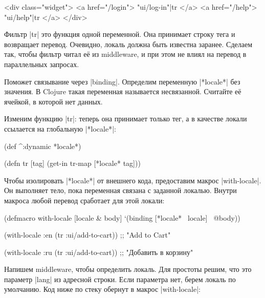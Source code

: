 \begin{english}
  \begin{htmldjango}
<div class="widget">
  <a href="/login">{{ "ui/log-in"|tr }}</a>
  <a href="/help">{{ "ui/help"|tr }}</a>
</div>
  \end{htmldjango}
\end{english}

Фильтр \spverb|tr| это функция одной переменной. Она принимает строку тега и
возвращает перевод. Очевидно, локаль должна быть известна заранее. Сделаем так,
чтобы фильтр читал е\"{е} из middleware, и при этом не влиял на перевод в параллельных
запросах.

Поможет связывание через \spverb|binding|. Определим переменную
\spverb|*locale*| без значения. В Clojure такая переменная называется
несвязанной. Считайте е\"{е} ячейкой, в которой нет данных.

Изменим функцию \spverb|tr|: теперь она принимает только тег, а в качестве
локали ссылается на глобальную \spverb|*locale*|:

\begin{english}
  \begin{clojure}
(def ^:dynamic *locale*)

(defn tr [tag]
  (get-in tr-map [*locale* tag]))
  \end{clojure}
\end{english}


Чтобы изолировать \spverb|*locale*| от внешнего кода, предоставим макрос
\spverb|with-locale|. Он выполняет тело, пока переменная связана с заданной
локалью. Внутри макроса любой перевод сработает для этой локали:

  \begin{clojure}
(defmacro with-locale
  [locale & body]
  `(binding [*locale* ~locale]
     ~@body))

(with-locale :en
  (tr :ui/add-to-cart))
;; "Add to Cart"

(with-locale :ru
  (tr :ui/add-to-cart))
;; "Добавить в корзину"
  \end{clojure}


Напишем middleware, чтобы определить локаль. Для простоты решим, что это
параметр \spverb|lang| из адресной строки. Если параметра нет, берем локаль по
умолчанию. Код ниже по стеку обернут в макрос \spverb|with-locale|:

